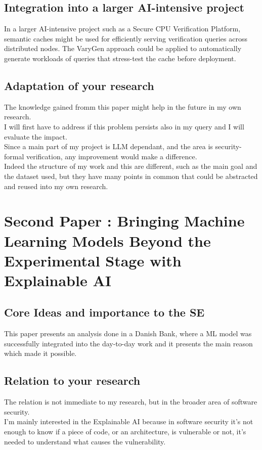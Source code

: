 \documentclass[12pt]{article}
\begin{document}
\subsection{Integration into a larger AI-intensive project}
In a larger AI-intensive project such as a Secure CPU Verification Platform, semantic caches might be used for efficiently serving verification queries across distributed nodes. The VaryGen approach could be applied to automatically generate workloads of queries that stress-test the cache before deployment. 

\subsection{Adaptation of your research}
The knowledge gained fromm this paper might help in the future in my own research. \\ I will first have to address if this problem persists also in my query and I will evaluate the impact. \\
Since a main part of my project is LLM dependant, and the area is security-formal verification, any improvement would make a difference. \\
Indeed the structure of my work and this are different, such as the main goal and the dataset used, but they have many points in common that could be abstracted and reused into my own research.\\

\section{Second Paper : Bringing Machine Learning Models Beyond the Experimental Stage with Explainable AI}

\subsection{Core Ideas and importance to the SE}
This paper presents an analysis done in a Danish Bank, where a ML model was successfully integrated into the day-to-day work and it presents the main reason which made it possible.

\subsection{Relation to your research}
The relation is not immediate to my research, but in the broader area of software security. \\
I'm mainly interested in the Explainable AI because in software security it's not enough to know if a piece of code, or an architecture, is vulnerable or not, it's needed to understand what causes the vulnerability. \\
\end{document}
